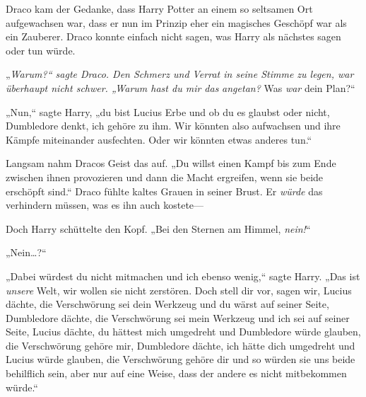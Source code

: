 Draco kam der Gedanke, dass Harry Potter an einem so seltsamen Ort aufgewachsen war, dass er nun im Prinzip eher ein magisches Geschöpf war als ein Zauberer. Draco konnte einfach nicht sagen, was Harry als nächstes sagen oder tun würde.

„\emph{Warum?“ sagte Draco. Den Schmerz und Verrat in seine Stimme zu legen, war überhaupt nicht schwer. „Warum hast du mir das} \emph{angetan?} Was \emph{war} dein Plan?“

„Nun,“ sagte Harry, „du bist Lucius Erbe und ob du es glaubst oder nicht, Dumbledore denkt, ich gehöre zu ihm. Wir könnten also aufwachsen und ihre Kämpfe miteinander ausfechten. Oder wir könnten etwas anderes tun.“

Langsam nahm Dracos Geist das auf. „Du willst einen Kampf bis zum Ende zwischen ihnen provozieren und dann die Macht ergreifen, wenn sie beide erschöpft sind.“ Draco fühlte kaltes Grauen in seiner Brust. Er \emph{würde} das verhindern müssen, was es ihn auch kostete—

Doch Harry schüttelte den Kopf. „Bei den Sternen am Himmel, \emph{nein!}“

„Nein…?“

„Dabei würdest du nicht mitmachen und ich ebenso wenig,“ sagte Harry. „Das ist \emph{unsere} Welt, wir wollen sie nicht zerstören. Doch stell dir vor, sagen wir, Lucius dächte, die Verschwörung sei dein Werkzeug und du wärst auf seiner Seite, Dumbledore dächte, die Verschwörung sei mein Werkzeug und ich sei auf seiner Seite, Lucius dächte, du hättest mich umgedreht und Dumbledore würde glauben, die Verschwörung gehöre mir, Dumbledore dächte, ich hätte dich umgedreht und Lucius würde glauben, die Verschwörung gehöre dir und so würden sie uns beide behilflich sein, aber nur auf eine Weise, dass der andere es nicht mitbekommen würde.“

